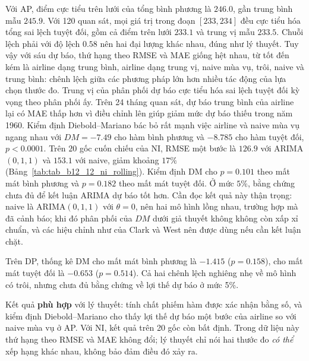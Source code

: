  Với AP, điểm cực tiểu trên lưới của tổng bình phương là $246.0$, gần trung bình mẫu $245.9$. Với 120 quan sát, mọi giá trị trong đoạn $[233,234]$ đều cực tiểu hóa tổng sai lệch tuyệt đối, gồm cả điểm trên lưới $233.1$ và trung vị mẫu $233.5$. Chuỗi lệch phải với độ lệch $0.58$ nên hai đại lượng khác nhau, đúng như lý thuyết. Tuy vậy với sáu dự báo, thứ hạng theo RMSE và MAE giống hệt nhau, từ tốt đến kém là airline dạng trung bình, airline dạng trung vị, naive mùa vụ, trôi, naive và trung bình: chênh lệch giữa các phương pháp lớn hơn nhiều tác động của lựa chọn thước đo. Trung vị của phân phối dự báo cực tiểu hóa sai lệch tuyệt đối kỳ vọng theo phân phối ấy. Trên 24 tháng quan sát, dự báo trung bình của airline lại có MAE thấp hơn vì điều chỉnh lên giúp giảm mức dự báo thiếu trong năm 1960. Kiểm định Diebold--Mariano bác bỏ rất mạnh việc airline và naive mùa vụ ngang nhau với $DM=-7.49$ cho hàm bình phương và $-8.785$ cho hàm tuyệt đối, $p<0.0001$. Trên $20$ gốc cuốn chiếu của NI, RMSE một bước là $126.9$ với ARIMA$(0,1,1)$ và $153.1$ với naive, giảm khoảng $17\%$ (Bảng~\ref{tab:tab_b12_12_ni_rolling}). Kiểm định DM cho $p=0.101$ theo mất mát bình phương và $p=0.182$ theo mất mát tuyệt đối. Ở mức $5\%$, bằng chứng chưa đủ để kết luận ARIMA dự báo tốt hơn. Cần đọc kết quả này thận trọng: naive là ARIMA$(0,1,1)$ với $\theta=0$, nên hai mô hình lồng nhau, trường hợp mà  đã cảnh báo; khi đó phân phối của $DM$ dưới giả thuyết không không còn xấp xỉ chuẩn, và các hiệu chỉnh như của Clark và West nên được dùng nếu cần kết luận chặt.

Trên DP, thống kê DM cho mất mát bình phương là $-1.415$ ($p=0.158$), cho mất mát tuyệt đối là $-0.653$ ($p=0.514$). Cả hai chênh lệch nghiêng nhẹ về mô hình có trôi, nhưng chưa đủ bằng chứng về lợi thế dự báo ở mức 5\%.

 Kết quả \textbf{phù hợp} với lý thuyết: tính chất phiếm hàm được xác nhận bằng số, và kiểm định Diebold--Mariano cho thấy lợi thế dự báo một bước của airline so với naive mùa vụ ở AP. Với NI, kết quả trên 20 gốc còn bất định. Trong dữ liệu này thứ hạng theo RMSE và MAE không đổi; lý thuyết chỉ nói hai thước đo \emph{có thể} xếp hạng khác nhau, không bảo đảm điều đó xảy ra.

